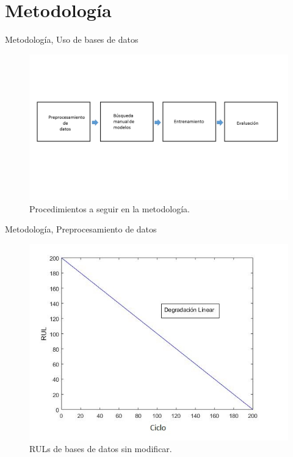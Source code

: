 
\section{Metodología}

\begin{frame}{Metodología, Uso de bases de datos}
\begin{figure}
    
    \includegraphics[scale=0.4]{animate/Presentacion1.png}
    \caption{Procedimientos a seguir en la metodología.}
    \label{fig:my_label}
\end{figure}
\end{frame}

\begin{frame}{Metodología, Preprocesamiento de datos}
    \begin{figure}
        \centering
        \includegraphics[scale=0.55]{animate/sin_modificar_RUL.jpg}
        \caption{RULs de bases de datos sin modificar.}
        \label{fig:my_label}
    \end{figure}
\end{frame}


